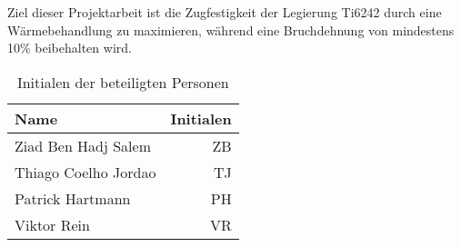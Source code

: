 Ziel dieser Projektarbeit ist die Zugfestigkeit der Legierung Ti6242 durch eine Wärmebehandlung zu maximieren, während eine Bruchdehnung von mindestens 10\% beibehalten wird.  

\begin{table}[h] 
	\centering 
	\begin{tabular}{lr} 
		
		Name & \hspace{0.5cm} Initialen\\ 
		\hline 
		Ziad Ben Hadj Salem & ZB\\
		Thiago Coelho Jordao & TJ\\
		Patrick Hartmann & PH\\
		Viktor Rein & VR\\
		\hline
		
	\end{tabular} 
	\caption{Initialen der beteiligten Personen} 
	\label{tab:initialien} 
\end{table} 

